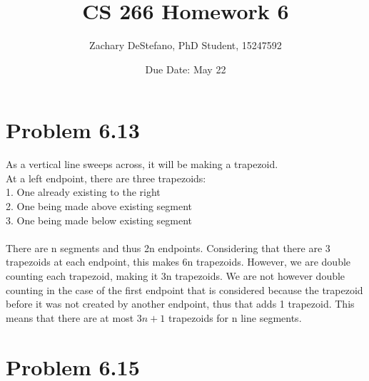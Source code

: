 \documentclass[11pt,psfig]{article}
\begin{document}
\setlength{\parskip}{1.2ex plus0.3ex minus 0.3ex}


\thispagestyle{empty} \pagestyle{myheadings} 



\title{CS 266 Homework 6}
\author{Zachary DeStefano, PhD Student, 15247592}
\date{Due Date: May 22}

\maketitle

\vfill\eject

\section*{Problem 6.13}

As a vertical line sweeps across, it will be making a trapezoid. \\
At a left endpoint, there are three trapezoids:\\
1. One already existing to the right\\
2. One being made above existing segment\\
3. One being made below existing segment\\
\\
There are n segments and thus 2n endpoints. Considering that there are 3 trapezoids at each endpoint, this makes 6n trapezoids. However, we are double counting each trapezoid, making it 3n trapezoids. We are not however double counting in the case of the first endpoint that is considered because the trapezoid before it was not created by another endpoint, thus that adds 1 trapezoid. This means that there are at most $3n+1$ trapezoids for n line segments.

\newpage

\section*{Problem 6.15}

 
\end{document}
